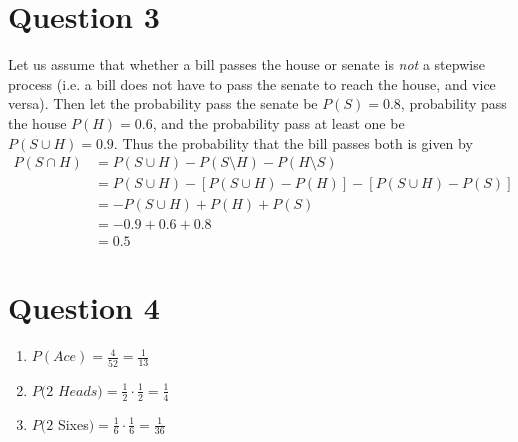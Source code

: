 \documentclass[11pt, oneside]{article}   	%
\begin{document}
\section*{Question 3}

Let us assume that whether a bill passes the house or senate is \textit{not} a stepwise process (i.e. a bill does not have to pass the senate to reach the house, and vice versa). Then let the probability pass the senate be $P(S)=0.8$, probability pass the house $P(H) = 0.6$, and the probability pass at least one be $P(S \cup H) =0.9$. Thus the probability that the bill passes both is given by
\begin{align*}
P(S \cap H) & = P(S \cup H) - P(S \setminus H) - P(H \setminus S) \\
& = P(S \cup H) - [P(S \cup H) - P(H)] - [P(S \cup H) - P(S)] \\
& = -P(S \cup H) + P(H) + P(S) \\
& = - 0.9 + 0.6 + 0.8 \\
& = 0.5
\end{align*}

\section*{Question 4}

\begin{enumerate}[ (a)]           
    \item $P(Ace) = \frac{4}{52} = \frac{1}{13}$
    \item $P(2$ $Heads) = \frac{1}{2} \cdot \frac{1}{2} = \frac{1}{4}$
    \item $P(2$ Sixes$) = \frac{1}{6} \cdot \frac{1}{6} = \frac{1}{36}$        
\end{enumerate}
\end{document}

